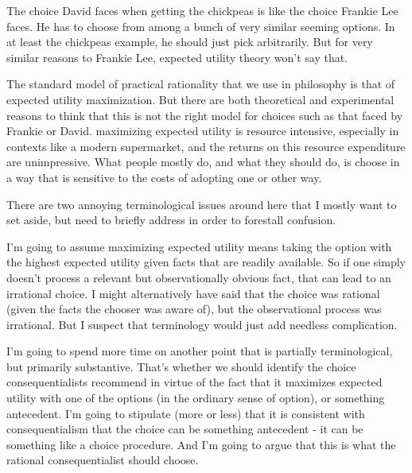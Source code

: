 \documentclass[
  11pt,
  letterpaper,
  DIV=11,
  numbers=noendperiod,
  twoside]{scrartcl}
\begin{document}
The choice David faces when getting the chickpeas is like the choice
Frankie Lee faces. He has to choose from among a bunch of very similar
seeming options. In at least the chickpeas example, he should just pick
arbitrarily. But for very similar reasons to Frankie Lee, expected
utility theory won't say that.

The standard model of practical rationality that we use in philosophy is
that of expected utility maximization. But there are both theoretical
and experimental reasons to think that this is not the right model for
choices such as that faced by Frankie or David. maximizing expected
utility is resource intensive, especially in contexts like a modern
supermarket, and the returns on this resource expenditure are
unimpressive. What people mostly do, and what they should do, is choose
in a way that is sensitive to the costs of adopting one or other way.

There are two annoying terminological issues around here that I mostly
want to set aside, but need to briefly address in order to forestall
confusion.

I'm going to assume maximizing expected utility means taking the option
with the highest expected utility given facts that are readily
available. So if one simply doesn't process a relevant but
observationally obvious fact, that can lead to an irrational choice. I
might alternatively have said that the choice was rational (given the
facts the chooser was aware of), but the observational process was
irrational. But I suspect that terminology would just add needless
complication.

I'm going to spend more time on another point that is partially
terminological, but primarily substantive. That's whether we should
identify the choice consequentialists recommend in virtue of the fact
that it maximizes expected utility with one of the options (in the
ordinary sense of option), or something antecedent. I'm going to
stipulate (more or less) that it is consistent with consequentialism
that the choice can be something antecedent - it can be something like a
choice procedure. And I'm going to argue that this is what the rational
consequentialist should choose.
\end{document}
